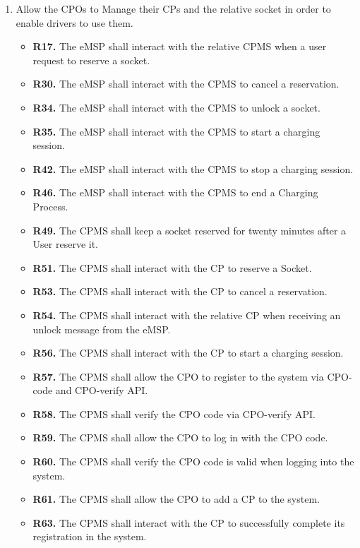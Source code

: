 \documentclass{Configuration_Files/PoliMi3i_thesis}
\begin{document}
\begin{enumerate}[label=\textbf{G\arabic*}]
    \item Allow the CPOs to Manage their CPs and the relative socket in order to enable drivers to use them.
        \begin{itemize}
            \item \textbf{R17.} The eMSP shall interact with the relative CPMS when a user request to reserve a socket.
            \item \textbf{R30.} The eMSP shall interact with the CPMS to cancel a reservation.
            \item \textbf{R34.} The eMSP shall interact with the CPMS to unlock a socket.
            \item \textbf{R35.} The eMSP shall interact with the CPMS to start a charging session.
            \item \textbf{R42.} The eMSP shall interact with the CPMS to stop a charging session.
            \item \textbf{R46.} The eMSP shall interact with the CPMS to end a Charging Process.
            \item \textbf{R49.} The CPMS shall keep a socket reserved for twenty minutes after a User reserve it.
            \item \textbf{R51.} The CPMS shall interact with the CP to reserve a Socket.
            \item \textbf{R53.} The CPMS shall interact with the CP to cancel a reservation.
            \item \textbf{R54.} The CPMS shall interact with the relative CP when receiving an unlock message from the eMSP.
            \item \textbf{R56.} The CPMS shall interact with the CP to start a charging session.
            \item \textbf{R57.} The CPMS shall allow the CPO to register to the system via CPO-code and CPO-verify API.
            \item \textbf{R58.} The CPMS shall verify the CPO code via CPO-verify API.
            \item \textbf{R59.} The CPMS shall allow the CPO to log in with the CPO code.
            \item \textbf{R60.} The CPMS shall verify the CPO code is valid when logging into the system.
            \item \textbf{R61.} The CPMS shall allow the CPO to add a CP to the system.
            \item \textbf{R63.} The CPMS shall interact with the CP to successfully complete its registration in the system.

\end{itemize}
\end{enumerate}
\end{document}
